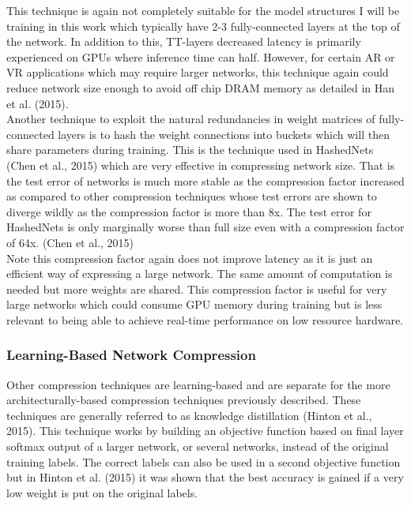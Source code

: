 \documentclass{article}
\begin{document}
This technique is again not completely suitable for the model structures I will be training in this work which typically have 2-3 fully-connected layers at the top of the network. In addition to this, TT-layers decreased latency is primarily experienced on GPUs where inference time can half. However, for certain AR or VR applications which may require larger networks, this technique again could reduce network size enough to avoid off chip DRAM memory as detailed in Han et al. (2015). \\

Another technique to exploit the natural redundancies in weight matrices of fully-connected layers is to hash the weight connections into buckets which will then share parameters during training. This is the technique used in HashedNets (Chen et al., 2015) which are very effective in compressing network size. That is the test error of networks is much more stable as the compression factor increased as compared to other compression techniques whose test errors are shown to diverge wildly as the compression factor is more than 8x. The test error for HashedNets is only marginally worse than full size even with a compression factor of 64x. (Chen et al., 2015)\\

Note this compression factor again does not improve latency as it is just an efficient way of expressing a large network. The same amount of computation is needed but more weights are shared. This compression factor is useful for very large networks which could consume GPU memory during training but is less relevant to being able to achieve real-time performance on low resource hardware. 

\subsubsection{Learning-Based Network Compression}
Other compression techniques are learning-based and are separate for the more architecturally-based compression techniques previously described. These techniques are generally referred to as knowledge distillation (Hinton et al., 2015). This technique works by building an objective function based on final layer softmax output of a larger network, or several networks, instead of the original training labels. The correct labels can also be used in a second objective function but in Hinton et al. (2015) it was shown that the best accuracy is gained if a very low weight is put on the original labels.\\
\end{document}
